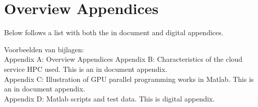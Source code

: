 \chapter{Overview Appendices}
Below follows a list with both the in document and digital appendices.

Voorbeelden van bijlagen:\\
Appendix A: \qquad  Overview Appendices
Appendix B: \qquad	Characteristics of the cloud service HPC used. This is an in document appendix.\\
Appendix C: \qquad	Illustration of GPU parallel programming works in Matlab. This is an in document appendix.\\
Appendix D: \qquad  Matlab scripts and test data. This is digital appendix.\\


